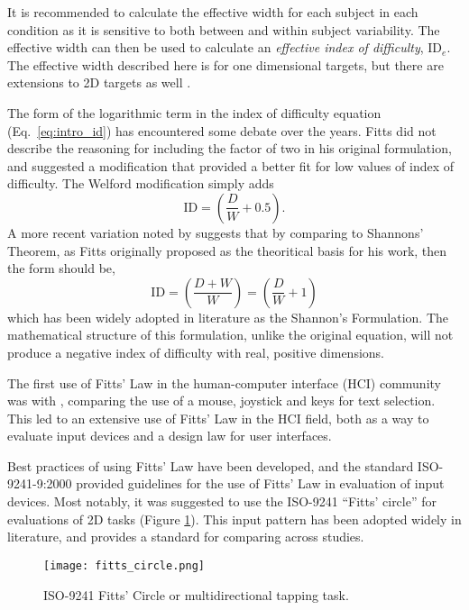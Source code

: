 It is recommended to calculate the effective width for each subject in each condition as it is sensitive to both between and within subject variability.
The effective width can then be used to calculate an \emph{effective index of difficulty}, \(\text{ID}_{e}\).
The effective width described here is for one dimensional targets, but there are extensions to 2D targets as well \citep{murata_extending_2001}.

The form of the logarithmic term in the index of difficulty equation (Eq.\ \ref{eq:intro_id}) has encountered some debate over the years.
Fitts did not describe the reasoning for including the factor of two in his original formulation, and \citet{welford_fundamentals_1968} suggested a modification that provided a better fit for low values of index of difficulty.
The Welford modification simply adds
\begin{equation}
    \mathrm{ID} = \left( \frac{D}{W} + 0.5 \right).
\end{equation}
A more recent variation noted by \citet{mackenzie_note_1989} suggests that by comparing to Shannons' Theorem, as Fitts originally proposed as the theoritical basis for his work, then the form should be,
\begin{equation}
    \mathrm{ID} = \left( \frac{D + W}{W} \right) = \left( \frac{D}{W} + 1 \right)
\end{equation}
which has been widely adopted in literature as the Shannon's Formulation.
The mathematical structure of this formulation, unlike the original equation, will not produce a negative index of difficulty with real, positive dimensions.


The first use of Fitts' Law in the human-computer interface (HCI) community was with \citet{card_evaluation_1978}, comparing the use of a mouse, joystick and keys for text selection.
This led to an extensive use of Fitts' Law in the HCI field, both as a way to evaluate input devices and a design law for user interfaces.

Best practices of using Fitts' Law have been developed, and the standard ISO-9241-9:2000 provided guidelines for the use of Fitts' Law in evaluation of input devices\citep{international_organization_for_standardization_iso_2000}.
Most notably, it was suggested to use the ISO-9241 ``Fitts' circle'' for evaluations of 2D tasks (Figure \ref{fig:intro_fitts_circle}).
This input pattern has been adopted widely in literature, and provides a standard for comparing across studies.

\begin{figure}
    \centering
    \texttt{[image: fitts\_circle.png]}
    \caption{ISO-9241 Fitts' Circle or multidirectional tapping task.}
    \label{fig:intro_fitts_circle}
\end{figure}

